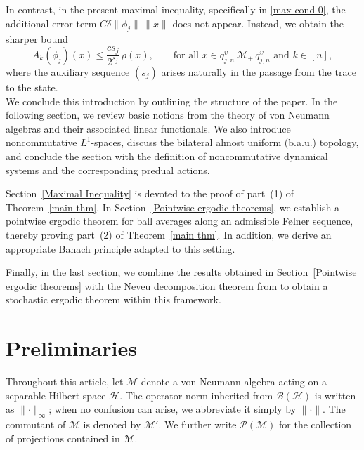 \documentclass[11pt]{amsart}
\theoremstyle{definition}
\theoremstyle{myremark}
\numberwithin{equation}{section}
\newcommand{\CM}{\mathcal{M}}
\newcommand{\ups}{\upsilon}
\begin{document}
In contrast, in the  present maximal inequality, specifically in  \cref{max-cond-0}, the additional error term $C\delta \|\phi_j\|\,\|x\|$ does not appear. Instead, we obtain the sharper bound
\[
A_k(\phi_j)(x) \leq \frac{c s_j}{2^{s_j}}\, \rho(x),
\qquad
\text{for all } x \in q^{\ups}_{j,n}\, \CM_+\, q^{\ups}_{j,n}
\text{ and } k \in [n],
\]
where the auxiliary sequence $(s_j)$ arises naturally in the passage from the trace to the state.\\








  We conclude this introduction by outlining the structure of the paper. In the following section, we review basic notions from the theory of von Neumann algebras and their associated linear functionals. We also introduce noncommutative $L^1$-spaces, discuss the bilateral almost uniform (b.a.u.) topology, and conclude the section with the definition of noncommutative dynamical systems and the corresponding predual actions.

Section~\ref{Maximal Inequality} is devoted to the proof of part~(1) of Theorem~\ref{main thm}. In Section~\ref{Pointwise ergodic theorems}, we establish a pointwise ergodic theorem for ball averages along an admissible F\o lner  sequence, thereby proving part~(2) of Theorem~\ref{main thm}. In addition, we derive an appropriate Banach principle adapted to this setting.

Finally, in the last section, we combine the results obtained in Section~\ref{Pointwise ergodic theorems} with the Neveu decomposition theorem from \cite{Bik-Dip-neveu} to obtain a stochastic ergodic theorem within this framework.
	





    
	\section{\bf Preliminaries}
Throughout this article, let \(\mathcal{M}\) denote a von Neumann algebra acting on a separable Hilbert space \(\mathcal{H}\). The operator norm inherited from \(\mathcal{B}(\mathcal{H})\) is written as \(\lVert \cdot \rVert_\infty\); when no confusion can arise, we abbreviate it simply by \(\lVert \cdot \rVert\). The commutant of \(\mathcal{M}\) is denoted by \(\mathcal{M}'\). We further write \(\mathcal{P}(\mathcal{M})\) for the collection of projections contained in \(\mathcal{M}\).\\
\end{document}
